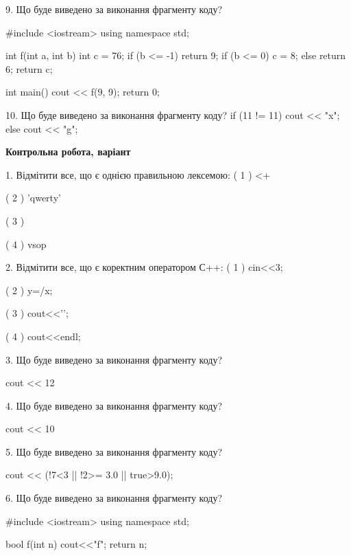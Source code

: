 \documentclass[11pt, ukrainian]{article}
\begin{document}
\begin{large}

9. Що буде виведено за виконання фрагменту коду?

#include <iostream>
using namespace std;

int f(int a, int b){
    int c = 76;
    if (b <= -1)
        return 9;
    if (b <= 0)
         c = 8;
    else 
        return 6;
    return c;
}

int main(){
    cout << f(9, 9);
    return 0;
}


10. Що буде виведено за виконання фрагменту коду?
if (11 != 11)
    cout << "x";
else
    cout << "g";


\end{large}
\newpage
\begin{large}
\textbf{Контрольна робота, варіант }\par

1. Відмітити все, що є однією правильною лексемою:
( 1 ) <+

( 2 ) 'qwerty'

( 3 ) {

( 4 ) vsop


2. Відмітити все, що є коректним оператором С++:
( 1 ) cin<<3;

( 2 ) y=/x;

( 3 ) cout<<'\n';

( 4 ) cout<<endl;


3. Що буде виведено за виконання фрагменту коду?

cout << 12 %


4. Що буде виведено за виконання фрагменту коду?

cout << 10 %


5. Що буде виведено за виконання фрагменту коду?

cout << (!7<3 || !2>= 3.0 || true>9.0);


6. Що буде виведено за виконання фрагменту коду?

#include <iostream>
using namespace std;

bool f(int n){
    cout<<"f";
    return n;
}

}
\end{large}
\end{document}
